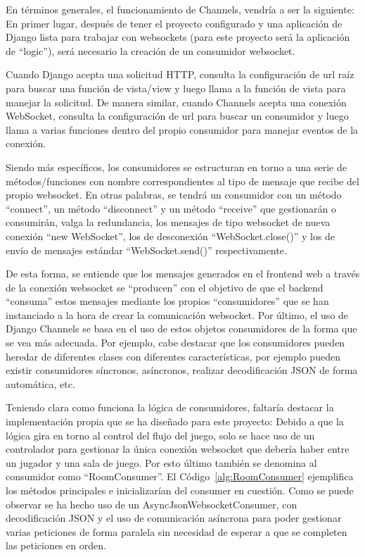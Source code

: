 En términos generales, el funcionamiento de Channels, vendría a ser la siguiente: En primer lugar, después de tener el proyecto configurado y una aplicación de Django lista para
trabajar con websockets (para este proyecto será la aplicación de ``logic''), será necesario la creación de un 
consumidor websocket.

Cuando Django acepta una solicitud HTTP, consulta la configuración de url raíz para buscar una función de vista/view y luego 
llama a la función de vista para manejar la solicitud. De manera similar, cuando Channels acepta una conexión WebSocket, 
consulta la configuración de url para buscar un consumidor y luego llama a varias funciones dentro del propio consumidor 
para manejar eventos de la conexión.

Siendo más específicos, los consumidores se estructuran en torno a una serie de métodos/funciones con nombre correspondientes al tipo de mensaje 
que recibe del propio websocket. En otras palabras, se tendrá un consumidor con un método ``connect'', un método ``disconnect'' y un método ``receive'' 
que gestionarán o consumirán, valga la redundancia, los mensajes de tipo websocket de nueva conexión ``new WebSocket'', los de desconexión 
``WebSocket.close()'' y los de envío de mensajes estándar ``WebSocket.send()'' respectivamente.

De esta forma, se entiende que los mensajes generados en el frontend web a través de la conexión websocket se ``producen'' con el objetivo
de que el backend ``consuma'' estos mensajes mediante los propios ``consumidores'' que se han instanciado a la hora de crear la comunicación websocket. 
Por último, el uso de Django Channels se basa en el uso de estos objetos consumidores de la forma que se vea 
más adecuada. Por ejemplo, cabe destacar que los consumidores pueden heredar de diferentes clases con diferentes características,
por ejemplo pueden existir consumidores síncronos, asíncronos, realizar decodificación JSON de forma automática, etc.

Teniendo clara como funciona la lógica de consumidores, faltaría destacar la implementación propia que se ha diseñado para este proyecto: Debido a que 
la lógica gira en torno al control del flujo del juego, solo se hace uso de un controlador para gestionar la única conexión websocket que debería haber entre
un jugador y una sala de juego. Por esto último también se denomina al consumidor como ``RoomConsumer''. El Código~\ref{alg:RoomConsumer} ejemplifica los métodos 
principales e inicializarían del consumer en cuestión. Como se puede observar se ha hecho uso de un AsyncJsonWebsocketConsumer, con decodificación JSON y el uso de 
comunicación asíncrona para poder gestionar varias peticiones de forma paralela sin necesidad de esperar a que se completen las peticiones en orden.

